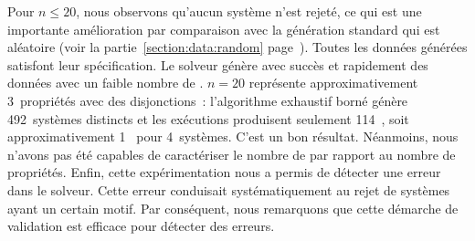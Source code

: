 Pour $n \leq 20$, nous observons qu'aucun système n'est rejeté, ce qui est une
importante amélioration par comparaison avec la génération standard qui est
aléatoire (voir la partie~\ref{section:data:random}
page~\pageref{section:data:random}). Toutes les données générées satisfont leur
spécification. Le solveur génère avec succès et rapidement des données avec un
faible nombre de . $n = 20$ représente approximativement
3~propriétés avec des disjonctions~: l'algorithme exhaustif borné génère
492~systèmes distincts et les exécutions produisent seulement
114~, soit approximativement 1~ pour
4~systèmes. C'est un bon résultat. Néanmoins, nous n'avons pas été capables de
caractériser le nombre de  par rapport au nombre de
propriétés. Enfin, cette expérimentation nous a permis de détecter une erreur
dans le solveur. Cette erreur conduisait systématiquement au rejet de systèmes
ayant un certain motif. Par conséquent, nous remarquons que cette démarche de
validation est efficace pour détecter des erreurs.
